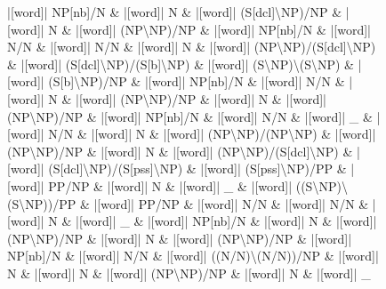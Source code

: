 \documentclass[10pt,a4paper]{article}
\begin{document}
\begin{figure}[h]
{\begin{dependency}[theme = simple]
\begin{deptext}[column sep=1em, row sep=0.1em]
|[word]| NP{[}nb{]}/N \& |[word]| N \& |[word]| (S{[}dcl{]}\textbackslash{}NP)/NP \& |[word]| N \& |[word]| (NP\textbackslash{}NP)/NP \& |[word]| NP{[}nb{]}/N \& |[word]| N/N \& |[word]| N/N \& |[word]| N \& |[word]| (NP\textbackslash{}NP)/(S{[}dcl{]}\textbackslash{}NP) \& |[word]| (S{[}dcl{]}\textbackslash{}NP)/(S{[}b{]}\textbackslash{}NP) \& |[word]| (S\textbackslash{}NP)\textbackslash{}(S\textbackslash{}NP) \& |[word]| (S{[}b{]}\textbackslash{}NP)/NP \& |[word]| NP{[}nb{]}/N \& |[word]| N/N \& |[word]| N \& |[word]| (NP\textbackslash{}NP)/NP \& |[word]| N \& |[word]| (NP\textbackslash{}NP)/NP \& |[word]| NP{[}nb{]}/N \& |[word]| N/N \& |[word]| \_ \& |[word]| N/N \& |[word]| N \& |[word]| (NP\textbackslash{}NP)/(NP\textbackslash{}NP) \& |[word]| (NP\textbackslash{}NP)/NP \& |[word]| N \& |[word]| (NP\textbackslash{}NP)/(S{[}dcl{]}\textbackslash{}NP) \& |[word]| (S{[}dcl{]}\textbackslash{}NP)/(S{[}pss{]}\textbackslash{}NP) \& |[word]| (S{[}pss{]}\textbackslash{}NP)/PP \& |[word]| PP/NP \& |[word]| N \& |[word]| \_ \& |[word]| ((S\textbackslash{}NP)\textbackslash{}(S\textbackslash{}NP))/PP \& |[word]| PP/NP \& |[word]| N/N \& |[word]| N/N \& |[word]| N \& |[word]| \_ \& |[word]| NP{[}nb{]}/N \& |[word]| N \& |[word]| (NP\textbackslash{}NP)/NP \& |[word]| N \& |[word]| (NP\textbackslash{}NP)/NP \& |[word]| NP{[}nb{]}/N \& |[word]| N/N \& |[word]| ((N/N)\textbackslash{}(N/N))/NP \& |[word]| N \& |[word]| N \& |[word]| (NP\textbackslash{}NP)/NP \& |[word]| N \& |[word]| \_ \\
\end{deptext}



\end{dependency}}
\end{figure}
\end{document}
